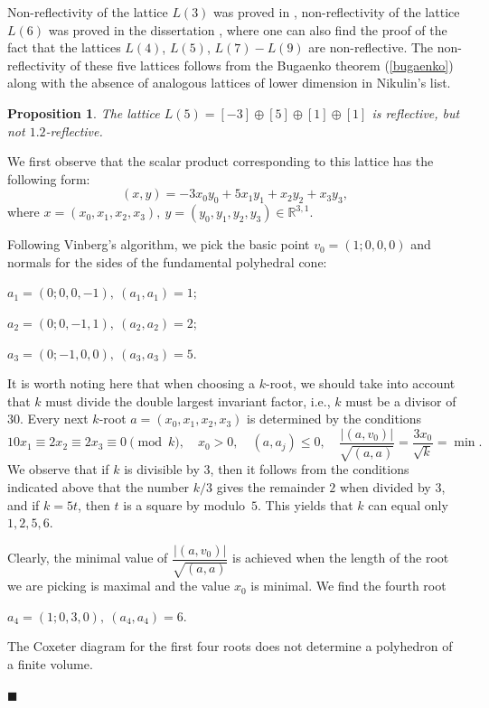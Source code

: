 \documentclass[14pt]{article}
\newtheorem{proposition}{\indent Proposition}[section]
\newenvironment{proof}                    
       {\par\indent{\bf Proof. }} 
	        {\hfill $\scriptstyle\blacksquare$}
\begin{document}
Non-reflectivity of the lattice $L(3)$ was proved in  \cite{mark13primelat},
non-reflectivity of the lattice $L(6)$ was proved in the dissertation
\cite{mcleod13arithhrgdisser}, where one can also find the proof
of the fact that the lattices
$L(4)$, $L(5)$, $L(7)-L(9)$ are non-reflective.
The non-reflectivity of these five lattices
follows from the Bugaenko theorem (\ref{bugaenko}) along with the
absence of analogous lattices of lower dimension in Nikulin's list.

\begin{proposition}
The lattice $L(5) = [-3] \oplus [5] \oplus [1] \oplus [1]$ is
reflective, but not $1.2$-reflective.
\end{proposition}
\begin{proof}
We first observe that   the scalar
product corresponding to this lattice has the following form:
$$
(x, y) = - 3 x_0 y_0 + 5 x_1 y_1 + x_2 y_2 + x_3 y_3,
$$
where $x = (x_0, x_1, x_2, x_3), \ y = (y_0, y_1, y_2, y_3)
\in \mathbb{R}^{3,1}$.

Following Vinberg's algorithm, we pick the basic point
$v_0 = (1; 0, 0, 0)$ and normals for the sides of the fundamental polyhedral cone:

$a_1 = (0; 0, 0, -1),  \ (a_1, a_1) = 1$;

$a_2 = (0; 0, -1, 1), \ (a_2, a_2) = 2$;

$a_3 = (0; -1, 0, 0), \ (a_3, a_3) = 5$.

It is worth noting here that when choosing a $k$-root, we should take into account
that $k$ must divide the double largest
invariant factor,  i.e., $k$ must be
a divisor of $30$. Every next $k$-root $a = (x_0, x_1, x_2, x_3)$
is determined by the conditions
$$
10 x_1 \equiv 2x_2 \equiv 2x_3 \equiv 0 \pmod k, \quad x_0 > 0,
\quad (a, a_j) \le 0, \quad
\dfrac{|(a, v_0)|}{\sqrt{(a, a)}} = \dfrac{3x_0}{\sqrt{k}}=
\min.
$$
We observe that if $k$ is divisible by $3$, then
it follows from the  conditions indicated above
that the number $k/3$ gives the remainder $2$ when divided by $3$,
and if $k = 5t$, then
$t$ is a square by modulo~$5$. This yields that
$k$ can equal only $1, 2, 5, 6$.

Clearly, the minimal value of $\dfrac{|(a, v_0)|}{\sqrt{(a, a)}}$
is achieved when the   length of the root we are picking is maximal and
the value $x_0$ is minimal. We find the fourth root

$a_4 = (1; 0, 3, 0), \ (a_4, a_4) = 6$.

The Coxeter  diagram for the first four roots does not determine
a polyhedron of a finite volume.


\end{proof}
\end{document}
